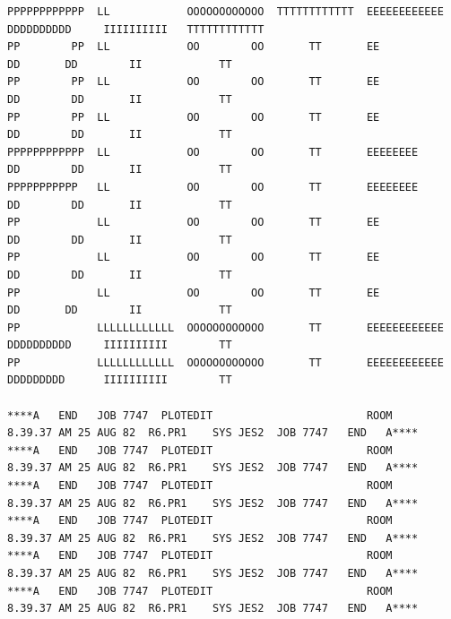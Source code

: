 {\fontsize{4}{5}\selectfont
\begin{verbatim}
PPPPPPPPPPPP  LL            OOOOOOOOOOOO  TTTTTTTTTTTT  EEEEEEEEEEEE  DDDDDDDDDD     IIIIIIIIII   TTTTTTTTTTTT
PP        PP  LL            OO        OO       TT       EE            DD       DD        II            TT
PP        PP  LL            OO        OO       TT       EE            DD        DD       II            TT
PP        PP  LL            OO        OO       TT       EE            DD        DD       II            TT
PPPPPPPPPPPP  LL            OO        OO       TT       EEEEEEEE      DD        DD       II            TT
PPPPPPPPPPP   LL            OO        OO       TT       EEEEEEEE      DD        DD       II            TT
PP            LL            OO        OO       TT       EE            DD        DD       II            TT
PP            LL            OO        OO       TT       EE            DD        DD       II            TT
PP            LL            OO        OO       TT       EE            DD       DD        II            TT
PP            LLLLLLLLLLLL  OOOOOOOOOOOO       TT       EEEEEEEEEEEE  DDDDDDDDDD     IIIIIIIIII        TT
PP            LLLLLLLLLLLL  OOOOOOOOOOOO       TT       EEEEEEEEEEEE  DDDDDDDDD      IIIIIIIIII        TT

****A   END   JOB 7747  PLOTEDIT                        ROOM        8.39.37 AM 25 AUG 82  R6.PR1    SYS JES2  JOB 7747   END   A****
****A   END   JOB 7747  PLOTEDIT                        ROOM        8.39.37 AM 25 AUG 82  R6.PR1    SYS JES2  JOB 7747   END   A****
****A   END   JOB 7747  PLOTEDIT                        ROOM        8.39.37 AM 25 AUG 82  R6.PR1    SYS JES2  JOB 7747   END   A****
****A   END   JOB 7747  PLOTEDIT                        ROOM        8.39.37 AM 25 AUG 82  R6.PR1    SYS JES2  JOB 7747   END   A****
****A   END   JOB 7747  PLOTEDIT                        ROOM        8.39.37 AM 25 AUG 82  R6.PR1    SYS JES2  JOB 7747   END   A****
****A   END   JOB 7747  PLOTEDIT                        ROOM        8.39.37 AM 25 AUG 82  R6.PR1    SYS JES2  JOB 7747   END   A****
\end{verbatim}
}
